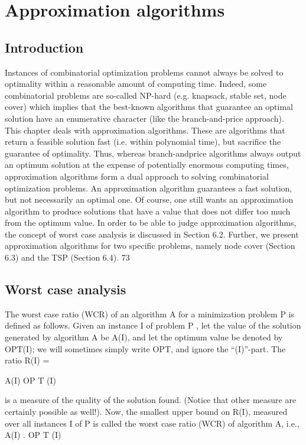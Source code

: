 \chapter{Approximation algorithms}

\section{Introduction}
Instances of combinatorial optimization problems cannot always be solved to optimality within a reasonable amount of computing time. Indeed, some combinatorial problems are so-called NP-hard (e.g.
knapsack, stable set, node cover) which implies that the best-known algorithms that guarantee an optimal solution have an enumerative character (like the branch-and-price approach).
This chapter deals with approximation algorithms. These are algorithms that return a feasible solution
fast (i.e. within polynomial time), but sacrifice the guarantee of optimality. Thus, whereas branch-andprice algorithms always output an optimum solution at the expense of potentially enormous computing
times, approximation algorithms form a dual approach to solving combinatorial optimization problems.
An approximation algorithm guarantees a fast solution, but not necessarily an optimal one. Of course,
one still wants an approximation algorithm to produce solutions that have a value that does not differ
too much from the optimum value. In order to be able to judge approximation algorithms, the concept
of worst case analysis is discussed in Section 6.2. Further, we present approximation algorithms for two
specific problems, namely node cover (Section 6.3) and the TSP (Section 6.4).
73

\section{Worst case analysis}

The worst case ratio (WCR) of an algorithm A for a minimization problem P is defined as follows. Given
an instance I of problem P , let the value of the solution generated by algorithm A be A(I), and let the
optimum value be denoted by OPT(I); we will sometimes simply write OPT, and ignore the “(I)”-part.
The ratio
R(I) =

A(I)
OP T (I)

is a measure of the quality of the solution found. (Notice that other measure are certainly possible as
well!). Now, the smallest upper bound on R(I), measured over all instances I of P is called the worst
case ratio (WCR) of algorithm A, i.e.,
A(I)
.
OP T (I)

